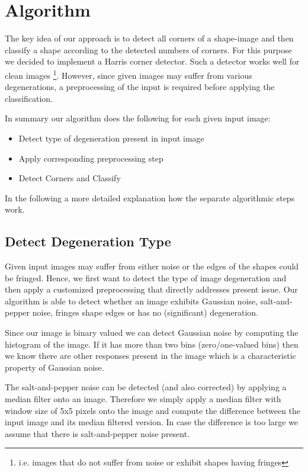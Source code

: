 \documentclass[conference]{IEEEtran}
\begin{document}
\section{Algorithm}
The key idea of our approach is to detect all corners of a shape-image and then classify a shape according to the detected numbers of corners. For this purpose we decided to implement a Harris corner detector. Such a detector works well for clean images \footnote{i.e. images that do not suffer from noise or exhibit shapes having fringes}. However, since given images may suffer from various degenerations, a preprocessing of the input is required before applying the classification. 

In summary our algorithm does the following for each given input image:
	\begin{itemize}
		\item Detect type of degeneration present in input image
		\item Apply corresponding preprocessing step
		\item Detect Corners and Classify
	\end{itemize}  
	
In the following a more detailed explanation how the separate algorithmic steps work.

\subsection{Detect Degeneration Type}
Given input images may suffer from either noise or the edges of the shapes could be fringed.
Hence, we first want to detect the type of image degeneration and then apply a customized preprocessing that directly addresses present issue. Our algorithm is able to detect whether an image exhibits Gaussian noise, salt-and-pepper noise, fringes shape edges or has no (significant) degeneration. 

Since our image is binary valued we can detect Gaussian noise by computing the histogram of the image. If it has more than two bins (zero/one-valued bins) then we know there are other responses present in the image which is a characteristic property of Gaussian noise. 

The salt-and-pepper noise can be detected (and also corrected) by applying a median filter onto an image. 
Therefore we simply apply a median filter with window size of 5x5 pixels onto the image and compute the difference between the input image and its median filtered version. 
In case the difference is too large we assume that there is salt-and-pepper noise present. 
\end{document}
